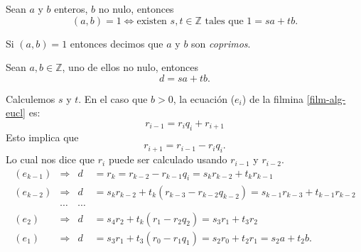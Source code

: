 \documentclass[handout]{beamer} %
\begin{document}
    \begin{frame}
        \frametitle{}

        \begin{corolario}
            Sean $a$ y $b$ enteros, $b$ no nulo, entonces
            $$
            (a,b) = 1 \Leftrightarrow \text{existen $s,t \in \mathbb Z$ tales que $1 = sa+tb$.}
            $$
        \end{corolario}
        \pause
        
    \begin{definicion}
        Si  $(a,b)=1$ entonces decimos que $a$ y $ b$ son {\em coprimos}.
    \end{definicion}


        
        
    
    \end{frame}

    
    \begin{frame}\label{film-alg-eucl-2}
        
        Sean $a, b \in \mathbb{Z}$, uno de ellos no nulo, entonces 
        $$
        d=sa+tb.
        $$
        \pause
        
        Calculemos $s$ y $t$. En el caso que $b >0$,  la  ecuación ($e_{i}$) de la filmina \ref{film-alg-eucl} es:
        $$
        r_{i-1}=r_{i}q_{i} + r_{i+1}
        $$\pause
        Esto implica que 
        $$
        r_{i+1} = r_{i-1}-r_{i}q_{i}.
        $$\pause
        Lo cual nos dice que $r_i$  puede ser calculado usando $r_{i-1}$ y $r_{i-2}$.
        \pause
        \begin{align*}
            (e_{k-1}) & \Rightarrow & d &= r_{k} =   r_{k-2}-r_{k-1}q_{i} = s_kr_{k-2}+ t_k r_{k-1} \\
            (e_{k-2}) & \Rightarrow &d &= s_kr_{k-2}+ t_k (r_{k-3}-r_{k-2}q_{k-2}) =s_{k-1}r_{k-3}+ t_{k-1} r_{k-2} \\
            &\cdots&\cdots&\\
            (e_{2}) & \Rightarrow & d &= s_4r_{2}+ t_k (r_{1}-r_{2}q_{2}) =s_{3}r_{1}+ t_{3} r_{2} \\
            (e_{1}) & \Rightarrow &d &= s_3r_{1}+ t_3 (r_{0}-r_{1}q_{1}) =s_{2}r_{0}+ t_{2} r_{1} =s_{2}a+ t_{2}b.
        \end{align*}
        
        
    \end{frame}
    
\end{document}
